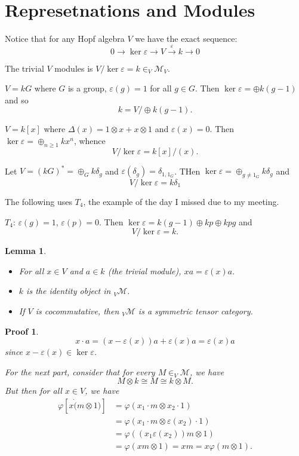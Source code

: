 \documentclass[12pt]{article}
\theoremstyle{break}
\theoremstyle{nonumberbreak}
\theoremstyle{changebreak}
\newtheorem{lem}[thm]{Lemma}
\theoremstyle{break}
\theoremstyle{nonumberbreak}
\newtheorem{prf}{Proof}
\theoremstyle{nonumberplain}
\theoremstyle{change}
\begin{document}
\section{Represetnations and Modules}
Notice that for any Hopf algebra $V$ we have the exact sequence:
\[0\to \ker\varepsilon\to V\xrightarrow{\varepsilon} k\to 0\]
\begin{defn}
	The trivial $V$ modules is $V/\ker\varepsilon=k\in _V\mathcal{M}_V$.
\end{defn}
\begin{ex}
	$V=kG$ where $G$ is a group, $\varepsilon(g)=1$ for all $g\in G$. Then $\ker\varepsilon=\oplus k(g-1)$ and so
	\[k=V/\oplus k(g-1).\]
\end{ex}
\begin{ex}
	$V=k[x]$ where $\Delta(x)=1\otimes x+x\otimes 1$ and $\varepsilon(x)=0$. Then $\ker\varepsilon=\oplus_{n\ge 1}kx^n$, whence
	\[V/\ker\varepsilon=k[x]/(x).\]
\end{ex}
\begin{ex}
	Let $V=(kG)^*=\oplus_G k\delta_g$ and $\varepsilon(\delta_g)=\delta_{1,1_G}$. THen $\ker\varepsilon=\oplus_{g\ne 1_G}k\delta_g$ and
	\[V/\ker\varepsilon=k\delta_1\]
\end{ex}
The following uses $T_4$, the example of the day I missed due to my meeting.
\begin{ex}
	$T_4$: $\varepsilon(g)=1$, $\varepsilon(p)=0$. Then $\ker\varepsilon=k(g-1)\oplus kp\oplus kpg$ and
	\[V/\ker\varepsilon=k.\]
\end{ex}
\begin{lem}
	\begin{itemize}
		\item For all $x \in V$ and $a\in k$ (the trivial module), $xa=\varepsilon(x)a$.
		\item $k$ is the identity object in $_V\mathcal{M}$.
		\item If $V$ is cocommutative, then $_V\mathcal{M}$ is a symmetric tensor category.
	\end{itemize}
\end{lem}
\begin{prf}
	\[x\cdot a=(x-\varepsilon(x))a+\varepsilon(x)a=\varepsilon(x)a\]
	since $x-\varepsilon(x)\in\ker\varepsilon$.

	For the next part, consider that for every $M\in _V\mathcal{M}$, we have 
	\[M\otimes k\cong M\cong k\otimes M.\]
	But then for all $x\in V$, we have
	\begin{align*}
		\varphi[x\dot(m\otimes 1)]&=\varphi(x_1\cdot m\otimes x_2\cdot 1)\\
		&=\varphi(x_1\cdot m\otimes \varepsilon(x_2)\cdot 1)\\
		&=\varphi((x_1\varepsilon(x_2))m\otimes 1)\\
		&=\varphi(xm\otimes 1)=xm=x\varphi(m\otimes 1).
	\end{align*}
\end{prf}
\end{document}
